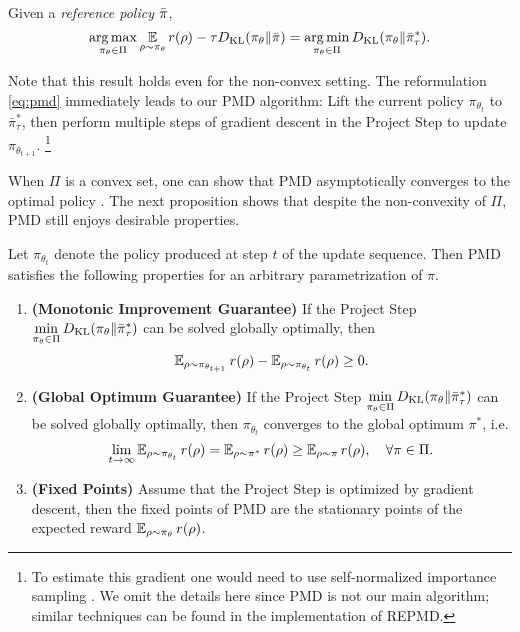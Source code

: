 \begin{prop}
\label{prop:mirrordescent_projection}
Given a \emph{reference policy} $\bar{\pi}$,
\[
 \operatorname*{arg\,max}\limits_{\pi_\theta \in \Pi} { \operatorname*{\mathbb{E}}\limits_{\rho \sim \pi_\theta}{  r(\rho)  - \tau D_{\mathrm{KL}}(\pi_\theta \| \bar{\pi}) } } 
 = \operatorname*{arg\,min}\limits_{\pi_\theta \in \Pi}{ D_{\mathrm{KL}}(\pi_\theta \| \bar{\pi}_\tau^*) }.
\]
\end{prop}

Note that this result holds even for the non-convex setting.
%
The reformulation \cref{eq:pmd} immediately leads to our PMD algorithm:
Lift the current policy $\pi_{\theta_t}$ to $\bar{\pi}_\tau^*$,
then perform multiple steps of gradient descent in the Project Step
to update $\pi_{\theta_{t+1}}$.%
%
\footnote{
To estimate this gradient one would need to use self-normalized importance
sampling \cite{owen2013monte}.
We omit the details here since PMD is not our main algorithm;
similar techniques can be found in the implementation of REPMD. 
}

When $\Pi$ is a convex set, one can show that PMD asymptotically converges to the optimal policy \citep{nemirovskii1983problem,beck2003mirror}. 
The next proposition shows that despite the non-convexity of $\Pi$,
PMD still enjoys desirable properties.

\begin{prop}
\label{prop:monoto_policymirrordescent}
Let $\pi_{\theta_{t}}$ denote the policy produced at step $t$ of
the update sequence.
Then PMD satisfies the following properties for an arbitrary 
parametrization of $\pi$.
\begin{enumerate}
	\item {\bf (Monotonic Improvement Guarantee)} 
	If the Project Step $\min\limits_{\pi_\theta \in \Pi}{D_{\mathrm{KL}}( \pi_\theta \| \bar{\pi}_{\tau}^* )}$ can be solved globally optimally, then
	 \begin{equation*}
	\operatorname{\mathbb{E}}_{\rho \sim \pi_{\theta_{t+1}}}{r(\rho)} - \operatorname{\mathbb{E}}_{\rho \sim \pi_{\theta_{t}}}{  r(\rho)} \ge 0.
	\end{equation*}
	\item  {\bf (Global Optimum Guarantee)} If the Project Step $\min\limits_{\pi_\theta \in \Pi}{D_{\mathrm{KL}}( \pi_\theta \| \bar{\pi}_{\tau}^* )}$ can be solved globally optimally, then $ \pi_{\theta_{t}}$ converges to the global optimum $\pi^*$, i.e. 
	\[
\lim_{t\rightarrow\infty}\operatorname{\mathbb{E}}_{\rho \sim \pi_{\theta_t}}{  r(\rho)}
=
	 \operatorname{\mathbb{E}}_{\rho \sim \pi^*}{  r(\rho)} \ge \operatorname{\mathbb{E}}_{\rho \sim \pi}{  r(\rho)}, \quad \forall \pi \in \Pi.
	\]
	\item {\bf (Fixed Points)} Assume that the Project Step is optimized by gradient descent, then the fixed points of PMD are the 
	 stationary points of the expected reward $\operatorname{\mathbb{E}}_{\rho \sim \pi_\theta}{  r(\rho)}$. 
\end{enumerate}
\end{prop}

